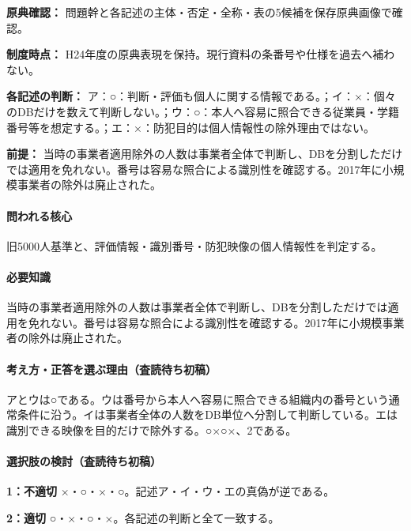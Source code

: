 \noindent\textbf{原典確認：} 問題幹と各記述の主体・否定・全称・表の5候補を保存原典画像で確認。\par

\noindent\textbf{制度時点：} H24年度の原典表現を保持。現行資料の条番号や仕様を過去へ補わない。\par

\noindent\textbf{各記述の判断：} ア：○：判断・評価も個人に関する情報である。；イ：×：個々のDBだけを数えて判断しない。；ウ：○：本人へ容易に照合できる従業員・学籍番号等を想定する。；エ：×：防犯目的は個人情報性の除外理由ではない。\par

\noindent\textbf{前提：} 当時の事業者適用除外の人数は事業者全体で判断し、DBを分割しただけでは適用を免れない。番号は容易な照合による識別性を確認する。2017年に小規模事業者の除外は廃止された。\par

\paragraph{問われる核心} 旧5000人基準と、評価情報・識別番号・防犯映像の個人情報性を判定する。

\paragraph{必要知識} 当時の事業者適用除外の人数は事業者全体で判断し、DBを分割しただけでは適用を免れない。番号は容易な照合による識別性を確認する。2017年に小規模事業者の除外は廃止された。

\paragraph{考え方・正答を選ぶ理由（査読待ち初稿）} アとウは○である。ウは番号から本人へ容易に照合できる組織内の番号という通常条件に沿う。イは事業者全体の人数をDB単位へ分割して判断している。エは識別できる映像を目的だけで除外する。○×○×、2である。

\paragraph{選択肢の検討（査読待ち初稿）}\mbox{}\par

\noindent\textbf{1：不適切} ×・○・×・○。記述ア・イ・ウ・エの真偽が逆である。\par

\noindent\textbf{2：適切} ○・×・○・×。各記述の判断と全て一致する。\par

